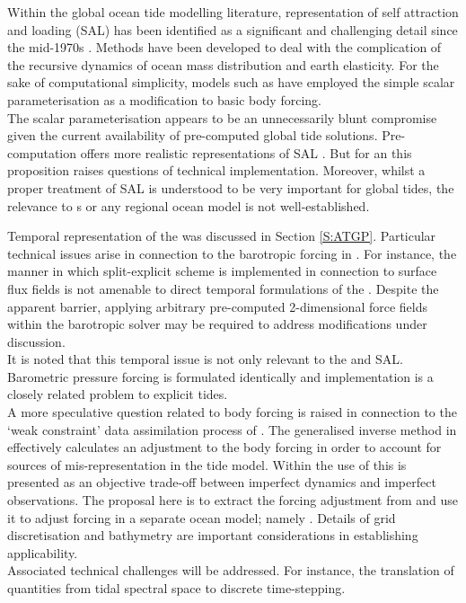 Within the global ocean tide modelling literature, representation of self attraction and loading (SAL) has been identified as a significant and challenging detail since the mid-1970s \cite[pp189]{Cartwright:2000tt}.
Methods have been developed to deal with the complication of the recursive dynamics of ocean mass distribution and earth elasticity.   For the sake of computational simplicity, models such as \MOM{} have employed the simple scalar parameterisation as a modification to basic body forcing.\\
The scalar parameterisation appears to be an unnecessarily blunt compromise given the current availability of pre-computed global tide solutions.  Pre-computation offers more realistic representations of SAL \citep{Egbert:2002ug}.   But for an \OGCM{} this proposition raises questions of technical implementation.  Moreover, whilst a proper treatment of SAL is understood to be very important for global tides, the relevance to \OGCM{}s or any regional ocean model is not well-established.  



Temporal representation of the \ATGP{} was discussed in Section \ref{S:ATGP}.   Particular technical issues arise in connection to the barotropic forcing in \MOM{}.  For instance, the manner in which split-explicit scheme is implemented in connection to surface flux fields is not amenable to direct temporal formulations of the \ATGP{}.  Despite the apparent barrier, applying arbitrary pre-computed 2-dimensional force fields within the barotropic solver may be required to address modifications under discussion.  \\
It is noted that this temporal issue is not only relevant to the \ATGP{} and SAL.  Barometric pressure forcing is formulated identically and implementation is a closely related problem to explicit tides.\\



A more speculative question related to body forcing is raised in connection to the `weak constraint' data assimilation process of \OTIS{}.  
The generalised inverse method in \OTIS{} effectively calculates an adjustment to the body forcing in order to account for sources of mis-representation in the tide model.  Within the use of \OTIS{} this is presented as an objective trade-off between imperfect dynamics and imperfect observations.  The proposal here is to extract the forcing adjustment from \OTIS{} and use it to adjust forcing in a separate ocean model; namely \MOM{}.  Details of grid discretisation and bathymetry are important considerations in establishing applicability.\\
Associated technical challenges will be addressed. For instance, the translation of quantities from tidal spectral space to discrete time-stepping.\\



